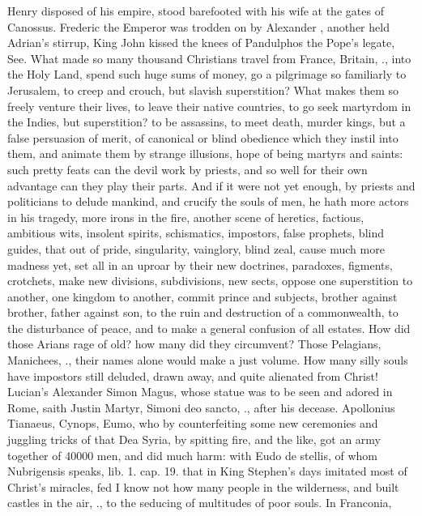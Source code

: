 {Henry  disposed of his empire, stood barefooted with his wife
at the gates of Canossus. Frederic the Emperor was trodden on by
Alexander , another held Adrian's stirrup, King John kissed the
knees of Pandulphos the Pope's legate, See. What made so many thousand
Christians travel from France, Britain, \etc{}., into the Holy Land, spend
such huge sums of money, go a pilgrimage so familiarly to Jerusalem, to
creep and crouch, but slavish superstition? What makes them so freely
venture their lives, to leave their native countries, to go seek
martyrdom in the Indies, but superstition? to be assassins, to meet
death, murder kings, but a false persuasion of merit, of canonical or
blind obedience which they instil into them, and animate them by
strange illusions, hope of being martyrs and saints: such pretty feats
can the devil work by priests, and so well for their own advantage can
they play their parts. And if it were not yet enough, by priests and
politicians to delude mankind, and crucify the souls of men, he hath
more actors in his tragedy, more irons in the fire, another scene of
heretics, factious, ambitious wits, insolent spirits, schismatics,
impostors, false prophets, blind guides, that out of pride,
singularity, vainglory, blind zeal, cause much more madness yet, set
all in an uproar by their new doctrines, paradoxes, figments,
crotchets, make new divisions, subdivisions, new sects, oppose one
superstition to another, one kingdom to another, commit prince and
subjects, brother against brother, father against son, to the ruin and
destruction of a commonwealth, to the disturbance of peace, and to make
a general confusion of all estates. How did those Arians rage of old?
how many did they circumvent? Those Pelagians, Manichees, \etc{}., their
names alone would make a just volume. How many silly souls have
impostors still deluded, drawn away, and quite alienated from Christ!
Lucian's Alexander Simon Magus, whose statue was to be seen and adored
in Rome, saith Justin Martyr, Simoni deo sancto, \etc{}., after his
decease. Apollonius Tianaeus, Cynops, Eumo, who by counterfeiting
some new ceremonies and juggling tricks of that Dea Syria, by spitting
fire, and the like, got an army together of 40\thinspace{}000 men, and did much
harm: with Eudo de stellis, of whom Nubrigensis speaks, lib. 1. cap.
19. that in King Stephen's days imitated most of Christ's miracles, fed
I know not how many people in the wilderness, and built castles in the
air, \etc{}., to the seducing of multitudes of poor souls. In Franconia,
}
